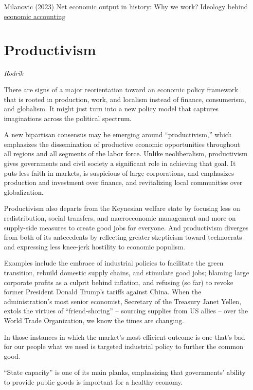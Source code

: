\documentclass[
]{book}
\begin{document}
\href{https://branko2f7.substack.com/p/net-economic-output-as-a-historic}{Milanovic (2023) Net economic output in history: Why we work? Ideology behind economic accounting}

\hypertarget{productivism}{%
\chapter{Productivism}\label{productivism}}

\emph{Rodrik}

There are signs of a major reorientation toward an economic policy framework that is rooted in production, work, and localism instead of finance, consumerism, and globalism. It might just turn into a new policy model that captures imaginations across the political spectrum.

A new bipartisan consensus may be emerging around ``productivism,'' which emphasizes the dissemination of productive economic opportunities throughout all regions and all segments of the labor force. Unlike neoliberalism, productivism gives governments and civil society a significant role in achieving that goal. It puts less faith in markets, is suspicious of large corporations, and emphasizes production and investment over finance, and revitalizing local communities over globalization.

Productivism also departs from the Keynesian welfare state by focusing less on redistribution, social transfers, and macroeconomic management and more on supply-side measures to create good jobs for everyone. And productivism diverges from both of its antecedents by reflecting greater skepticism toward technocrats and expressing less knee-jerk hostility to economic populism.

Examples include the embrace of industrial policies to facilitate the green transition, rebuild domestic supply chains, and stimulate good jobs; blaming large corporate profits as a culprit behind inflation, and refusing (so far) to revoke former President Donald Trump's tariffs against China. When the administration's most senior economist, Secretary of the Treasury Janet Yellen, extols the virtues of ``friend-shoring'' -- sourcing supplies from US allies -- over the World Trade Organization, we know the times are changing.

In those instances in which the market's most efficient outcome is one that's bad for our people what we need is targeted industrial policy to further the common good.

``State capacity'' is one of its main planks, emphasizing that governments' ability to provide public goods is important for a healthy economy.
\end{document}
